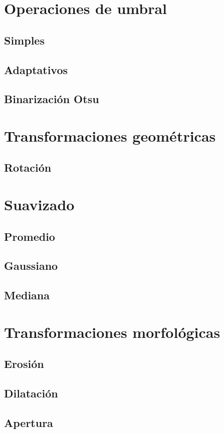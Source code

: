 \section{Operaciones de umbral}
\subsection{Simples}
\subsection{Adaptativos}
\subsection{Binarización Otsu}

\section{Transformaciones geométricas}
\subsection{Rotación}

\section{Suavizado}
\subsection{Promedio}
\subsection{Gaussiano}
\subsection{Mediana}

\section{Transformaciones morfológicas}
\subsection{Erosión}
\subsection{Dilatación}
\subsection{Apertura}
